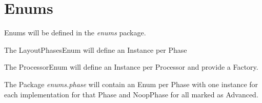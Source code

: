 \section{Enums}

Enums will be defined in the \textit{enums} package.

The LayoutPhasesEnum will define an Instance per Phase

The ProcessorEnum will define an Instance per Processor and provide a Factory.

The Package \textit{enums.phase} will contain an Enum per Phase with one
instance for each implementation for that Phase and NoopPhase for all marked as Advanced.


